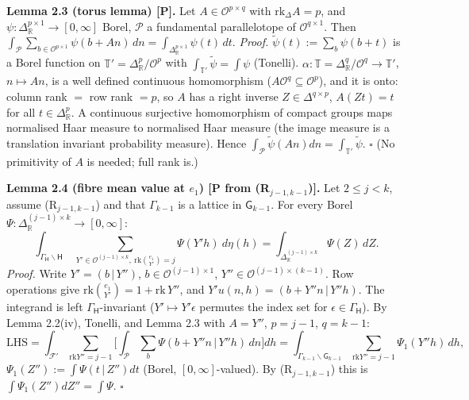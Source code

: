 \textbf{Lemma 2.3 (torus lemma) {[}P{]}.} Let \(A\in\mathcal O^{p\times q}\) with \(\mathrm{rk}_\Delta A=p\), and \(\psi:\Delta_{\mathbb R}^{p\times1}\to[0,\infty]\) Borel, \(\mathcal P\) a fundamental parallelotope of \(\mathcal O^{q\times1}\). Then \(\int_{\mathcal P}\sum_{b\in\mathcal O^{p\times1}}\psi(b+An)\,dn=\int_{\Delta_{\mathbb R}^{p\times1}}\psi(t)\,dt\).
\emph{Proof.} \(\tilde\psi(t):=\sum_b\psi(b+t)\) is a Borel function on \(\mathbb T'=\Delta_{\mathbb R}^{p}/\mathcal O^{p}\) with \(\int_{\mathbb T'}\tilde\psi=\int\psi\) (Tonelli). \(\alpha:\mathbb T=\Delta_{\mathbb R}^{q}/\mathcal O^{q}\to\mathbb T'\), \(n\mapsto An\), is a well defined continuous homomorphism (\(A\mathcal O^q\subseteq\mathcal O^p\)), and it is onto: column rank \(=\) row rank \(=p\), so \(A\) has a right inverse \(Z\in\Delta^{q\times p}\), \(A(Zt)=t\) for all \(t\in\Delta_{\mathbb R}^p\). A continuous surjective homomorphism of compact groups maps normalised Haar measure to normalised Haar measure (the image measure is a translation invariant probability measure). Hence \(\int_{\mathcal P}\tilde\psi(An)dn=\int_{\mathbb T'}\tilde\psi\). \(\square\) (No primitivity of \(A\) is needed; full rank is.)

\textbf{Lemma 2.4 (fibre mean value at \(e_1\)) {[}P from (R\(_{j-1,k-1}\)){]}.} Let \(2\le j<k\), assume (R\(_{j-1,k-1}\)) and that \(\Gamma_{k-1}\) is a lattice in \(\mathsf G_{k-1}\). For every Borel \(\Psi:\Delta_{\mathbb R}^{(j-1)\times k}\to[0,\infty]\):
\[\int_{\Gamma_{\mathsf H}\backslash\mathsf H}\ \sum_{Y'\in\mathcal O^{(j-1)\times k},\ \mathrm{rk}\binom{e_1}{Y'}=j}\Psi(Y'h)\ d\eta(h)=\int_{\Delta_{\mathbb R}^{(j-1)\times k}}\Psi(Z)\,dZ .\]
\emph{Proof.} Write \(Y'=(b\,|\,Y'')\), \(b\in\mathcal O^{(j-1)\times1}\), \(Y''\in\mathcal O^{(j-1)\times(k-1)}\). Row operations give \(\mathrm{rk}\binom{e_1}{Y'}=1+\mathrm{rk}\,Y''\), and \(Y'u(n,h)=(b+Y''n\,|\,Y''h)\). The integrand is left \(\Gamma_{\mathsf H}\)-invariant (\(Y'\mapsto Y'\epsilon\) permutes the index set for \(\epsilon\in\Gamma_{\mathsf H}\)). By Lemma 2.2(iv), Tonelli, and Lemma 2.3 with \(A=Y''\), \(p=j-1\), \(q=k-1\):
\[\text{LHS}=\int_{\mathcal F'}\sum_{\mathrm{rk}Y''=j-1}\Big[\int_{\mathcal P}\sum_b\Psi(b+Y''n\,|\,Y''h)\,dn\Big]dh=\int_{\Gamma_{k-1}\backslash\mathsf G_{k-1}}\sum_{\mathrm{rk}Y''=j-1}\Psi_1(Y''h)\,dh,\]
\(\Psi_1(Z''):=\int\Psi(t\,|\,Z'')dt\) (Borel, \([0,\infty]\)-valued). By (R\(_{j-1,k-1}\)) this is \(\int\Psi_1(Z'')dZ''=\int\Psi\). \(\square\)

